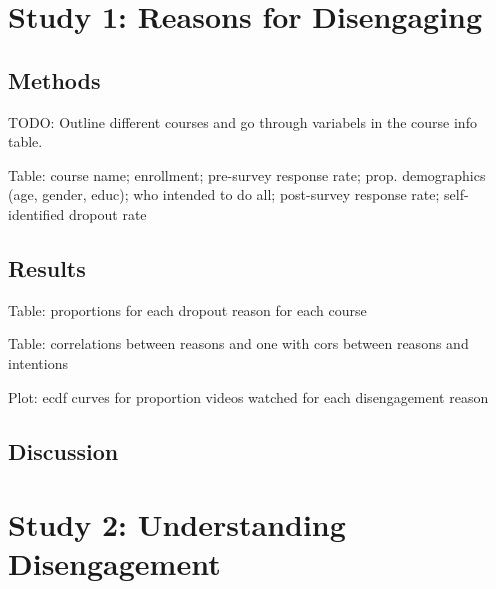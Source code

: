 \documentclass{sigchi}\usepackage[]{graphicx}\usepackage[]{color}
\begin{document}
\section{Study 1: Reasons for Disengaging}



\subsection{Methods}

TODO: Outline different courses and go through variabels in the course info table.

Table:  course name; enrollment; pre-survey response rate; prop. demographics (age, gender, educ); who intended to do all; post-survey response rate; self-identified dropout rate


\subsection{Results}

Table: proportions for each dropout reason for each course

Table: correlations between reasons and one with cors between reasons and intentions

Plot: ecdf curves for proportion videos watched for each disengagement reason


\subsection{Discussion}


\section{Study 2: Understanding Disengagement}
\end{document}

